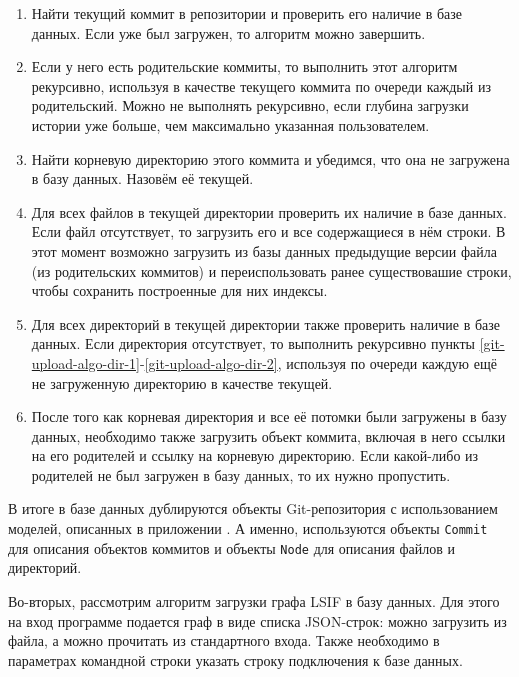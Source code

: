 \begin{enumerate}
    \item Найти текущий коммит в репозитории и проверить его наличие в базе данных. Если уже был загружен, то алгоритм можно завершить.
    \item Если у него есть родительские коммиты, то выполнить этот алгоритм рекурсивно, используя в качестве текущего коммита по очереди каждый из родительский. Можно не выполнять рекурсивно, если глубина загрузки истории уже больше, чем максимально указанная пользователем.
    \item Найти корневую директорию этого коммита и убедимся, что она не загружена в базу данных. Назовём её текущей.
    \item \label{git-upload-algo-dir-1} Для всех файлов в текущей директории проверить их наличие в базе данных. Если файл отсутствует, то загрузить его и все содержащиеся в нём строки. В этот момент возможно загрузить из базы данных предыдущие версии файла (из родительских коммитов) и переиспользовать ранее существовашие строки, чтобы сохранить построенные для них индексы.
    \item \label{git-upload-algo-dir-2} Для всех директорий в текущей директории также проверить наличие в базе данных. Если директория отсутствует, то выполнить рекурсивно пункты \ref{git-upload-algo-dir-1}-\ref{git-upload-algo-dir-2}, используя по очереди каждую ещё не загруженную директорию в качестве текущей.
    \item После того как корневая директория и все её потомки были загружены в базу данных, необходимо также загрузить объект коммита, включая в него ссылки на его родителей и ссылку на корневую директорию. Если какой-либо из родителей не был загружен в базу данных, то их нужно пропустить.
\end{enumerate}

В итоге в базе данных дублируются объекты Git-репозитория с использованием моделей, описанных в приложении . А именно, используются объекты \texttt{Commit} для описания объектов коммитов и объекты \texttt{Node} для описания файлов и директорий.

Во-вторых, рассмотрим алгоритм загрузки графа LSIF в базу данных. Для этого на вход программе подается граф в виде списка JSON-строк: можно загрузить из файла, а можно прочитать из стандартного входа. Также необходимо в параметрах командной строки указать строку подключения к базе данных.

